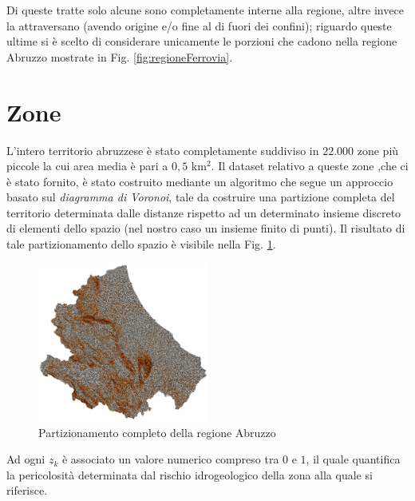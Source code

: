 Di queste tratte solo alcune sono completamente interne alla regione, altre invece la attraversano (avendo origine e/o fine al di fuori dei confini); riguardo queste ultime si è scelto di considerare unicamente le porzioni che cadono nella regione Abruzzo mostrate in Fig. \ref{fig:regioneFerrovia}.
\newpage

\section{Zone}
\label{zone}
L'intero territorio abruzzese è stato completamente suddiviso in $22.000$ zone più piccole la cui area media è pari a $0,5$ km$^2$. Il dataset relativo a queste zone ,che ci è stato fornito, è stato costruito mediante un algoritmo che segue un approccio basato sul \textit{diagramma di Voronoi}, tale da costruire una partizione completa del territorio determinata dalle distanze rispetto ad un determinato insieme discreto di elementi dello spazio (nel nostro caso un insieme finito di punti). Il risultato di tale partizionamento dello spazio è visibile nella Fig. \ref{fig:dataset}.
\begin{figure}[h]
	\centering
	\includegraphics[width=0.5\textwidth]{img/dataset}
	\caption{Partizionamento completo della regione Abruzzo}
    \label{fig:dataset}
\end{figure}

Ad ogni $z_k$ è associato un valore numerico compreso tra $0$ e $1$, il quale quantifica la pericolosità determinata dal rischio idrogeologico della zona alla quale si riferisce.


